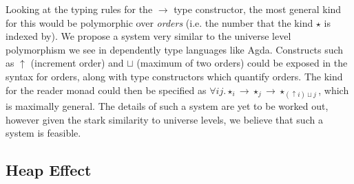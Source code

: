 \documentclass[runningheads]{llncs}
\begin{document}


Looking at the typing rules for the $\rightarrow$ type constructor, the most general kind for this would be polymorphic over \emph{orders} (i.e. the number that the kind $\star$ is indexed by). We propose a system very similar to the universe level polymorphism \cite{kovacs2021generalized} we see in dependently type languages like Agda. Constructs such as $\uparrow$ (increment order) and $\sqcup$ (maximum of two orders) could be exposed in the syntax for orders, along with type constructors which quantify orders. The kind for the reader monad could then be specified as $\forall i j. \star_i \rightarrow \star_j \rightarrow \star_{(\uparrow i) \sqcup j}$, which is maximally general. The details of such a system are yet to be worked out, however given the stark similarity to universe levels, we believe that such a system is feasible.




\subsection{Heap Effect}
\end{document}
